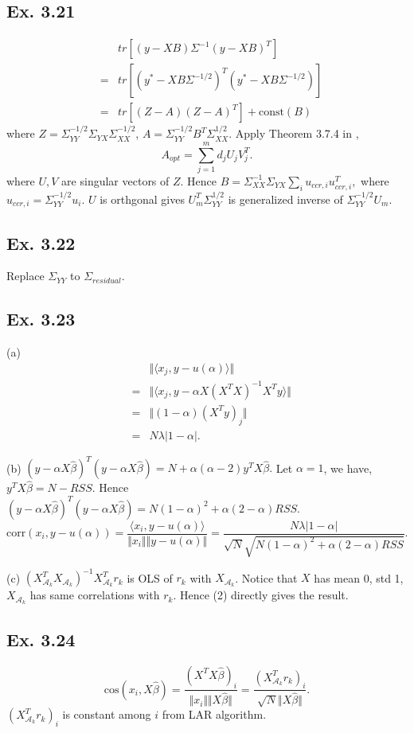 \subsection*{Ex. 3.21}
\begin{eqnarray*}
    & & tr\left[(y-XB)\Sigma^{-1}(y-XB)^{T}\right]\\
    &=& tr\left[(y^{*}-XB\Sigma^{-1/2})^{T}(y^{*}-XB\Sigma^{-1/2})\right]\\
    &=& tr\left[(Z-A)(Z-A)^T\right] + \mbox{const}(B)
\end{eqnarray*}
where $Z=\Sigma_{YY}^{-1/2}\Sigma_{YX}\Sigma_{XX}^{-1/2}$, $A=\Sigma_{YY}^{-1/2}B^{T}\Sigma_{XX}^{1/2}$. Apply Theorem 3.7.4 in \cite{Brillinger},
$$A_{opt} = \sum_{j=1}^m d_{j} U_{j} V_{j}^T.$$
where $U, V$ are singular vectors of $Z$. Hence $B=\Sigma_{XX}^{-1}\Sigma_{YX}\sum_{i} u_{ccr,i} u_{ccr,i}^T,$ where
$u_{ccr,i} = \Sigma_{YY}^{-1/2}u_{i}.$ $U$ is orthgonal gives $U_{m}^T \Sigma_{YY}^{1/2}$ is generalized inverse of $\Sigma_{YY}^{-1/2}U_{m}.$

\subsection*{Ex. 3.22}
Replace $\Sigma_{YY}$ to $\Sigma_{residual}$.

\subsection*{Ex. 3.23}

(a)
\begin{eqnarray*}
    & & \Vert \langle x_j, y - u(\alpha) \rangle \Vert\\
    &=& \Vert \langle x_j, y - \alpha X(X^TX)^{-1}X^Ty \rangle \Vert\\
    &=& \Vert (1 - \alpha)(X^Ty)_{j}\Vert\\
    &=& N\lambda|1 - \alpha|.
\end{eqnarray*}

(b) $(y-\alpha X\hat{\beta})^T(y-\alpha X\hat{\beta}) = N + \alpha (\alpha - 2) y^T X \hat{\beta}.$ Let $\alpha = 1$, we have, $y^T X \hat{\beta} = N - RSS.$ Hence
$(y-\alpha X\hat{\beta})^T(y-\alpha X\hat{\beta}) =N(1-\alpha)^2 + \alpha(2 - \alpha)RSS.$
$$\mbox{corr}(x_{i}, y-u(\alpha))=\frac{\langle x_{i}, y-u(\alpha)\rangle}{\Vert x_{i}\Vert \Vert y-u(\alpha)\Vert}=\frac{N\lambda|1 - \alpha|}{\sqrt{N}\sqrt{N(1-\alpha)^2 + \alpha(2 - \alpha)RSS}}.$$

(c) $(X_{\mathcal{A}_{k}}^T X_{\mathcal{A}_{k}})^{-1}X_{\mathcal{A}_{k}}^T r_{k}$ is OLS of $r_{k}$ with $X_{\mathcal{A}_{k}}$. Notice that $X$ has mean 0, std 1, $X_{\mathcal{A}_{k}}$ has same correlations with $r_{k}$. Hence (2) directly gives the result. 

\subsection*{Ex. 3.24}
$$\mbox{cos}(x_{i}, X\hat{\beta})=\frac{(X^T X\hat{\beta})_{i}}{\Vert x_{i}\Vert \Vert X\hat{\beta}\Vert}=\frac{(X_{\mathcal{A}_{k}}^Tr_{k})_{i}}{\sqrt{N} \Vert X\hat{\beta}\Vert}.$$
$(X_{\mathcal{A}_{k}}^Tr_{k})_{i}$ is constant among $i$ from LAR algorithm.
